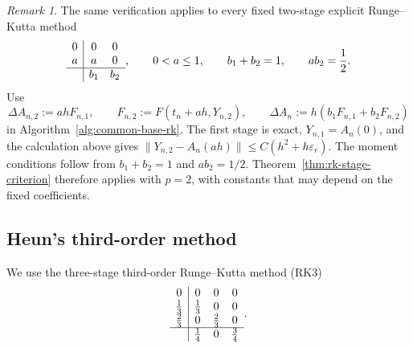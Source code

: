 \documentclass[]{article}
\numberwithin{equation}{section}
\theoremstyle{plain}
\theoremstyle{remark}
\newtheorem{remark}[theorem]{Remark}
\numberwithin{algorithm}{section}
\newcommand{\eps}{\varepsilon}
\begin{document}
\begin{remark}
The same verification applies to every fixed two-stage explicit
Runge--Kutta method
\[
 \begin{array}{c|cc}
  0&0&0\\
  a&a&0\\ \hline
   &b_1&b_2
 \end{array},
 \qquad 0<a\le1,\qquad b_1+b_2=1,\qquad ab_2=\frac12.
\]
Use
\[
 \Delta A_{n,2}:=ahF_{n,1},\qquad
 F_{n,2}:=F(t_n+ah,Y_{n,2}),\qquad
 \Delta A_n:=h(b_1F_{n,1}+b_2F_{n,2})
\]
in Algorithm~\ref{alg:common-base-rk}.  The first stage is exact,
\(Y_{n,1}=A_n(0)\), and the calculation above gives
\(\|Y_{n,2}-A_n(ah)\|\le C(h^2+h\eps_r)\).
The moment conditions follow from \(b_1+b_2=1\) and \(ab_2=1/2\).
Theorem~\ref{thm:rk-stage-criterion} therefore applies with \(p=2\),
with constants that may depend on the fixed coefficients.
\end{remark}

\subsection{Heun's third-order method}
\label{sec:rk3}

We use the three-stage third-order Runge--Kutta method (RK3)
\begin{equation}\label{eq:heun-tableau}
\begin{array}{c|ccc}
0&0&0&0\\
\frac13&\frac13&0&0\\
\frac23&0&\frac23&0\\ \hline
&\frac14&0&\frac34
\end{array}.
\end{equation}
\end{document}
